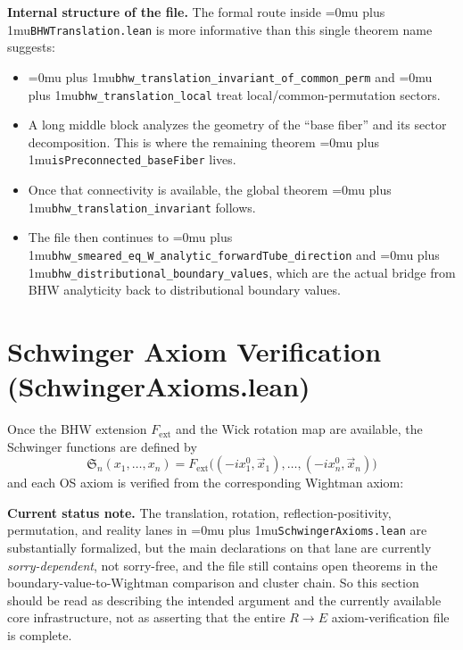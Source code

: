 \documentclass[11pt,a4paper]{article}
\newcommand{\leanfile}[1]{\begingroup\Urlmuskip=0mu plus 1mu\relax\nolinkurl{#1}\endgroup}
\newcommand{\leanname}[1]{\begingroup\Urlmuskip=0mu plus 1mu\relax\nolinkurl{#1}\endgroup}
\begin{document}
\medskip\noindent
\textbf{Internal structure of the file.}
The formal route inside \leanfile{BHWTranslation.lean} is more informative than
this single theorem name suggests:
\begin{itemize}
\item \leanname{bhw\_translation\_invariant\_of\_common\_perm} and
  \leanname{bhw\_translation\_local} treat local/common-permutation sectors.
\item A long middle block analyzes the geometry of the ``base fiber'' and its
  sector decomposition. This is where the remaining theorem
  \leanname{isPreconnected\_baseFiber} lives.
\item Once that connectivity is available, the global theorem
  \leanname{bhw\_translation\_invariant} follows.
\item The file then continues to
  \leanname{bhw\_smeared\_eq\_W\_analytic\_forwardTube\_direction} and
  \leanname{bhw\_distributional\_boundary\_values}, which are the actual bridge
  from BHW analyticity back to distributional boundary values.
\end{itemize}


\section{Schwinger Axiom Verification (SchwingerAxioms.lean)}

Once the BHW extension $F_{\mathrm{ext}}$ and the Wick rotation map are available,
the Schwinger functions are defined by
\[
\mathfrak{S}_n(x_1, \ldots, x_n) =
F_{\mathrm{ext}}\bigl((-ix_1^0, \vec{x}_1), \ldots, (-ix_n^0, \vec{x}_n)\bigr)
\]
and each OS axiom is verified from the corresponding Wightman axiom:

\medskip\noindent
\textbf{Current status note.} The translation, rotation, reflection-positivity,
permutation, and reality lanes in \leanfile{SchwingerAxioms.lean} are
substantially formalized, but the main declarations on that lane are currently
\emph{sorry-dependent}, not sorry-free, and the file still contains open theorems in
the boundary-value-to-Wightman comparison and cluster chain. So this section
should be read as describing the intended argument and the currently available
core infrastructure, not as asserting that the entire $R \to E$
axiom-verification file is complete.
\end{document}
